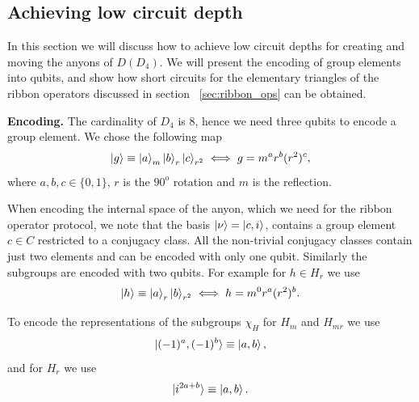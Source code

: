 \documentclass[two column]{article}
\begin{document}

\subsection{Achieving low circuit depth }\label{subsec:enc}

In this section we will discuss how to achieve low circuit depths for creating and moving the anyons of $D(D_4)$. We will present the encoding of group elements into qubits, and show how short circuits for the elementary triangles of the ribbon operators discussed in section ~\ref{sec:ribbon_ops} can be obtained.

\textbf{Encoding.} 
The cardinality of $D_4$ is 8, hence we need three qubits to encode a group element.
We chose the following map
\begin{equation}
    \ket{g} \equiv \ket{a}_m\ket{b}_r\ket{c}_{r^2} \iff g = m^a r^b (r^2)^c,
\end{equation}
where $a,b,c \in \{0,1\}$, $r$ is the $90^{\text{o}}$ rotation and $m$ is the reflection.

When encoding the internal space of the anyon, which we need for the ribbon operator protocol, we note that the basis $\ket{\nu} = \ket{c, i}$, contains a group element $c\in C$ restricted to a conjugacy class. All the non-trivial conjugacy classes contain just two elements and can be encoded with only one qubit. Similarly the subgroups are encoded with two qubits. For example for $h\in H_r$ we use\begin{equation}
    \ket{h} \equiv \ket{a}_r\ket{b}_{r^2} \iff h = m^0r^a(r^2)^b.
\end{equation}


To encode the representations of the subgroups $\chi_H$ for $H_m$ and $H_{mr}$ we use
\begin{equation}
    \ket{(-1)^a,(-1)^b} \equiv \ket{a,b},
\end{equation}
and for $H_{r}$ we use
\begin{equation}
    \ket{i^{2a+b}} \equiv \ket{a, b}.
\end{equation}
\end{document}
